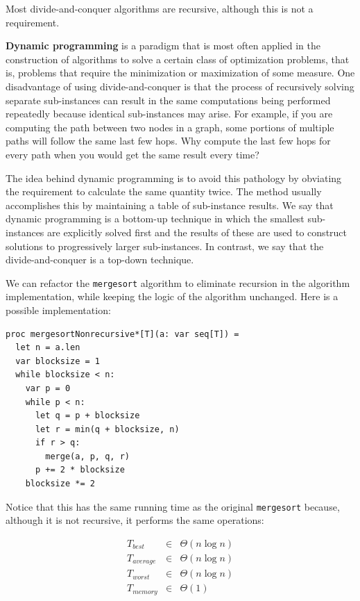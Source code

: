 \documentclass[justified, sixbynine]{tufte-book}
\def\ft{\small\tt}
\theoremstyle{plain}%
\newtheorem * {corollary}{Corollary}
\theoremstyle{definition}
\theoremstyle{remark}
\newtheorem * {remark}{Remark}
\newtheorem * {note}{Note}
\begin{document}
\begin{fullwidth}
Most divide-and-conquer algorithms are recursive, although this is not a requirement.

{\bf Dynamic programming}
is a paradigm that is most often applied in the
construction of algorithms to solve a certain class of optimization
problems, that is, problems that require the minimization or maximization of
some measure. One disadvantage of using divide-and-conquer is that the
process of recursively solving separate sub-instances can result in the same
computations being performed repeatedly because identical sub-instances may
arise. For example, if you are computing the path between two nodes in a graph, 
some portions of multiple paths will follow the same last few hops. Why compute
the last few hops for every path when you would get the same result every time?

The idea behind dynamic programming is to avoid this pathology by
obviating the requirement to calculate the same quantity twice. The method
usually accomplishes this by maintaining a table of sub-instance results. We
say that dynamic programming is a bottom-up technique in which the smallest
sub-instances are explicitly solved first and the results of these are used to
construct solutions to progressively larger sub-instances. In contrast, we
say that the divide-and-conquer is a top-down technique.


We can refactor the {\ft mergesort} algorithm to eliminate recursion in the algorithm implementation, while keeping the logic of the algorithm unchanged. Here is a possible implementation:
\begin{lstlisting}
proc mergesortNonrecursive*[T](a: var seq[T]) =
  let n = a.len
  var blocksize = 1
  while blocksize < n:
    var p = 0
    while p < n:
      let q = p + blocksize
      let r = min(q + blocksize, n)
      if r > q:
        merge(a, p, q, r)
      p += 2 * blocksize
    blocksize *= 2
\end{lstlisting}

Notice that this has the same running time as the original {\ft mergesort} because, although it is not recursive, it performs the same operations:

\begin{eqnarray}
T_{best} &\in &\Theta (n\log n) \\
T_{average} &\in &\Theta (n\log n) \\
T_{worst} &\in &\Theta (n\log n) \\
T_{memory} &\in &\Theta (1)
\end{eqnarray}


\end{fullwidth}
\end{document}
